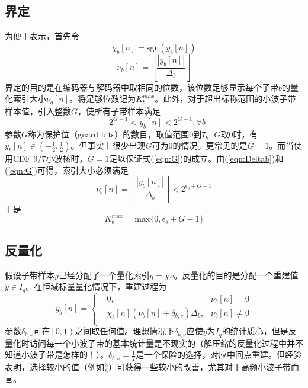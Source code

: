 \subsection{界定}
为便于表示，首先令
\begin{equation}
\chi_{b}[n]=\text{sgn}(y_{b}[n])
\end{equation}
\begin{equation}
\nu_{b}[n]=\left\lfloor\frac{|y_{b}[n]|}{\Delta_{b}}\right\rfloor
\end{equation}
界定的目的是在编码器与解码器中取相同的位数，该位数足够显示每个子带$b$的量化索引大小$\nu_{q}[n]$。将足够位数记为$K_{b}^{max}$。此外，对于超出标称范围的小波子带样本值，引入整数$G$，使所有子带样本满足
\begin{equation}
-2^{G-1}<y_{b}[n]<2^{G-1}, \forall b\label{eqn:G}
\end{equation}
参数$G$称为保护位（guard bits）的数目，取值范围0到7。$G$取0时，有$y_{b}[n]\in \left(-\frac{1}{2}, \frac{1}{2}\right)$。但事实上很少出现$G$可为0的情况。更常见的是$G=1$。而当使用CDF 9/7小波核时，$G=1$足以保证式(\ref{eqn:G})的成立。由(\ref{eqn:Deltab})和(\ref{eqn:G})可得，索引大小必须满足
\begin{equation}
\nu_{b}[n]=\left\lfloor\frac{|y_{b}[n]|}{\Delta_{b}}\right\rfloor<2^{\epsilon_{b}+G-1}
\end{equation}
于是
\begin{equation}
K_{b}^{max}=\text{max}\{0, \epsilon_{b}+G-1\}
\end{equation}

\subsection{反量化}
假设子带样本$y$已经分配了一个量化索引$q=\chi\nu$。反量化的目的是分配一个重建值$\hat{y}\in I_{q}$。在恒域标量量化情况下，重建过程为
\begin{equation}
\hat{y}_{b}[n]=
\left\{
	\begin{aligned}
	&0, &\nu_{b}[n]=0\\
	&\chi_{b}[n](\nu_{b}[n]+\delta_{b,\nu})\Delta_{b}, &\nu_{b}[n]\neq 0\\
	\end{aligned}
\right.
\end{equation}
参数$\delta_{b,\nu}$可在$\left[0,1\right)$之间取任何值。理想情况下$\delta_{b,\nu}$应使$\hat{y}$为$I_{q}$的统计质心，但是反量化时访问每一个小波子带的基本统计量是不现实的（解压缩的反量化过程中并不知道小波子带是怎样的！）。$\delta_{b,\nu}=\frac{1}{2}$是一个保险的选择，对应中间点重建。但经验表明，选择较小的值（例如$\frac{3}{8}$）可获得一些较小的改善，尤其对于高频小波子带而言。

